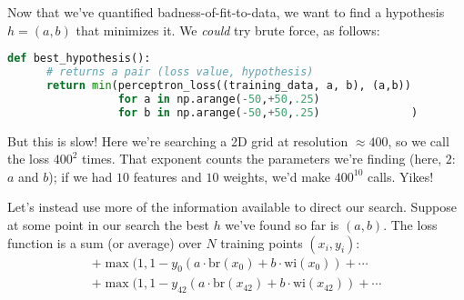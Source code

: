 \newpage
{}
  Now that we've quantified badness-of-fit-to-data, we want to find a
  hypothesis $h=(a,b)$ that minimizes it.
  We
  \emph{could} try brute force, as follows:
  \begin{lstlisting}[language=Python, basicstyle=\footnotesize\ttfamily]
    def best_hypothesis():
      # returns a pair (loss value, hypothesis)
      return min(perceptron_loss((training_data, a, b), (a,b))
                 for a in np.arange(-50,+50,.25)
                 for b in np.arange(-50,+50,.25)              )
  \end{lstlisting}
  But this is slow!  Here we're searching a 2D grid at resolution $\approx
  400$, so we call the loss $400^2$ times.  That exponent counts the parameters
  we're finding (here, $2$: $a$ and $b$); if we had $10$ features and $10$
  weights, we'd make $400^{10}$ calls.  Yikes!
  \begin{marginfigure}[-2cm]
    \centering
    \caption{%
      With $\lambda=0.02$ the objective visibly prefers weights near $0$.
      We develop an algorithm to take steps in this plane
      toward the minimum, `rolling down' the hill so to speak.
    }
  \end{marginfigure}

  Let's instead use more of the information available to direct our search.
  Suppose at some point in our search the best $h$ we've found so far is
  $(a, b)$.  The loss function is a sum (or average) over $N$
  training points $(x_i, y_i)$:
  \begin{align*}
      +\max(1,1-{y_{0}}  (a \cdot {\text{br}(x_{0})} + b \cdot{\text{wi}(x_{0})})+\cdots
    \\+\max(1,1-{y_{42}} (a \cdot {\text{br}(x_{42})} + b \cdot{\text{wi}(x_{42})})+\cdots
  \end{align*}

